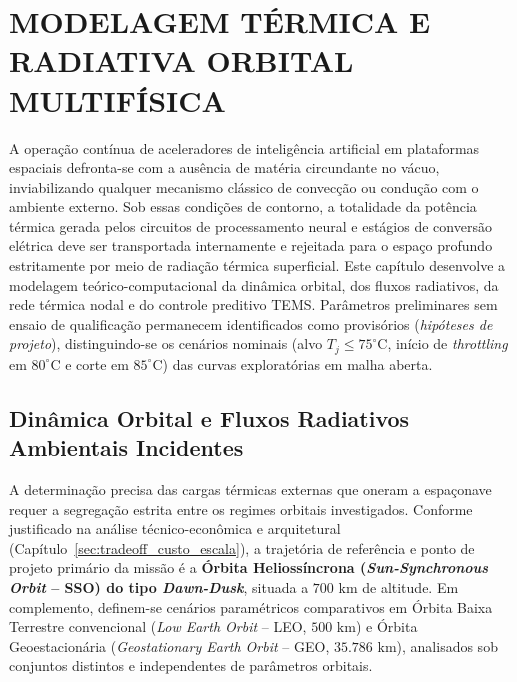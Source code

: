 \section{MODELAGEM TÉRMICA E RADIATIVA ORBITAL MULTIFÍSICA}
\label{sec:capitulo4_modelagem_termica}

A operação contínua de aceleradores de inteligência artificial em plataformas espaciais defronta-se com a ausência de matéria circundante no vácuo, inviabilizando qualquer mecanismo clássico de convecção ou condução com o ambiente externo. Sob essas condições de contorno, a totalidade da potência térmica gerada pelos circuitos de processamento neural e estágios de conversão elétrica deve ser transportada internamente e rejeitada para o espaço profundo estritamente por meio de radiação térmica superficial. Este capítulo desenvolve a modelagem teórico-computacional da dinâmica orbital, dos fluxos radiativos, da rede térmica nodal e do controle preditivo TEMS. Parâmetros preliminares sem ensaio de qualificação permanecem identificados como provisórios (\textit{hipóteses de projeto}), distinguindo-se os cenários nominais (alvo $T_j \le 75^\circ\text{C}$, início de \textit{throttling} em $80^\circ\text{C}$ e corte em $85^\circ\text{C}$) das curvas exploratórias em malha aberta.

\subsection{Dinâmica Orbital e Fluxos Radiativos Ambientais Incidentes}
\label{sec:dinamica_orbital_fluxos}

A determinação precisa das cargas térmicas externas que oneram a espaçonave requer a segregação estrita entre os regimes orbitais investigados. Conforme justificado na análise técnico-econômica e arquitetural (Capítulo~\ref{sec:tradeoff_custo_escala}), a trajetória de referência e ponto de projeto primário da missão é a \textbf{Órbita Heliossíncrona (\textit{Sun-Synchronous Orbit} -- SSO) do tipo \textit{Dawn-Dusk}}, situada a $700\text{ km}$ de altitude. Em complemento, definem-se cenários paramétricos comparativos em Órbita Baixa Terrestre convencional (\textit{Low Earth Orbit} -- LEO, $500\text{ km}$) e Órbita Geoestacionária (\textit{Geostationary Earth Orbit} -- GEO, $35.786\text{ km}$), analisados sob conjuntos distintos e independentes de parâmetros orbitais.

